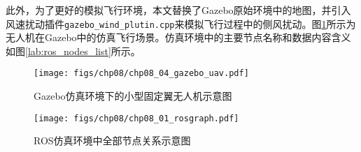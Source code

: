 此外，为了更好的模拟飞行环境，本文替换了Gazebo原始环境中的地图，并引入风速扰动插件\texttt{gazebo\_wind\_plutin.cpp}来模拟飞行过程中的侧风扰动。图\ref{fig:chp08_04_gazebo_uav}所示为无人机在Gazebo中的仿真飞行场景。仿真环境中的主要节点名称和数据内容含义如图\ref{lab:ros_nodes_list}所示。

\begin{figure}[!ht]
	\centering
	\texttt{[image: figs/chp08/chp08\_04\_gazebo\_uav.pdf]}	
	\caption{Gazebo仿真环境下的小型固定翼无人机示意图}
	\label{fig:chp08_04_gazebo_uav}
\end{figure}

\begin{figure}[!ht]
	\centering
	\texttt{[image: figs/chp08/chp08\_01\_rosgraph.pdf]}	
	\caption{ROS仿真环境中全部节点关系示意图}
	\label{fig:chp08_01_rosgraph}
\end{figure}

